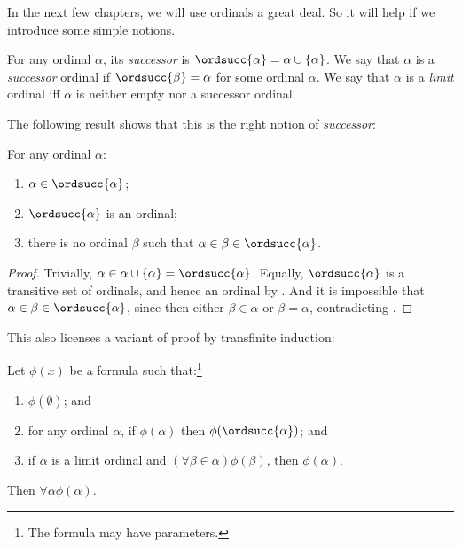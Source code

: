 \documentclass[../../../include/open-logic-section]{subfiles}
\begin{document}

In the next few chapters, we will use ordinals a great deal. So it
will help if we introduce some simple notions. 

\begin{defn}
For any ordinal $\alpha$, its \emph{successor} is $\ordsucc{\alpha}
=\alpha \cup \{\alpha\}$. We say that $\alpha$ is a \emph{successor}
ordinal if $\ordsucc{\beta} = \alpha$ for some ordinal $\alpha$. We
say that $\alpha$ is a \emph{limit} ordinal iff $\alpha$ is neither
empty nor a successor ordinal.
\end{defn}

The following result shows that this is the right notion of
\emph{successor}:

\begin{prop}
For any ordinal $\alpha$:
\begin{enumerate}
	\item $\alpha \in \ordsucc{\alpha}$;
	\item $\ordsucc{\alpha}$ is an ordinal;
	\item there is no ordinal $\beta$ such that $\alpha \in \beta \in
	\ordsucc{\alpha}$.
	\end{enumerate}
\end{prop}

\begin{proof}
Trivially, $\alpha \in \alpha \cup \{\alpha\} = \ordsucc{\alpha}$.
Equally, $\ordsucc{\alpha}$ is a transitive set of ordinals, and hence
an ordinal by .
And it is impossible that $\alpha \in \beta \in \ordsucc{\alpha}$,
since then either $\beta \in \alpha$ or $\beta = \alpha$,
contradicting .
\end{proof}

This also licenses a variant of proof by transfinite induction:

\begin{thm}
Let $\phi(x)$ be a formula such that:\footnote{The formula may have
parameters.} 
\begin{enumerate}
	\item $\phi(\emptyset)$; and
	\item for any ordinal $\alpha$, if $\phi(\alpha)$ then
	$\phi(\ordsucc{\alpha})$; and 
	\item if $\alpha$ is a limit ordinal and $(\forall \beta \in
	\alpha)\phi(\beta)$, then $\phi(\alpha)$.
\end{enumerate}
Then $\forall \alpha \phi(\alpha)$.
\end{thm}
\end{document}
